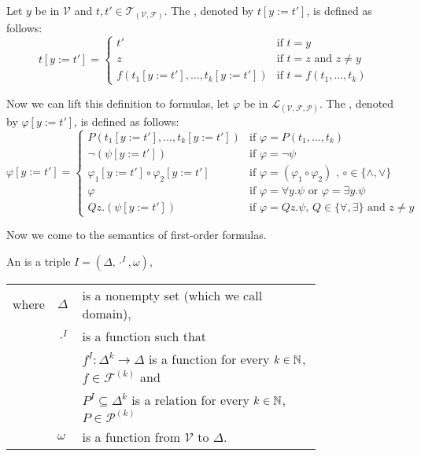 \begin{definition}\label{def.2.20}
	Let $y$ be in $\mathcal{V}$ and $t,t'\in\mathcal{T}_{(\mathcal{V},\mathcal{F})}$. The , denoted by $t\left[y:=t'\right]$, is defined as follows:
	\[t\left[y:=t'\right]=
		\begin{cases}
			t'                                                   & \text{if $t=y$}                \\ 
			z                                                    & \text{if $t=z$ and $z\neq y$}  \\%
			f(t_1\left[y:=t'\right],\dots,t_k\left[y:=t'\right]) & \text{if $t=f(t_1,\dots,t_k)$} 
		\end{cases}\]
	
	Now we can lift this definition to formulas, let $\varphi$ be in $\mathcal{L}_{(\mathcal{V},\mathcal{F},\mathcal{P})}$. The , denoted by $\varphi\left[y:=t'\right]$, is defined as follows:
	\[\varphi\left[y:=t'\right]=
		\begin{cases}
			P(t_1\left[y:=t'\right],\dots,t_k\left[y:=t'\right])        & \text{if $\varphi=P(t_1,\dots,t_k)$}                                     \\
			\neg(\psi\left[y:=t'\right])                                      & \text{if $\varphi=\neg\psi$}                                             \\ %
			\varphi_1\left[y:=t'\right]\circ\varphi_2\left[y:=t'\right] & \text{if $\varphi=(\varphi_1\circ\varphi_2)$ , $\circ\in\{\wedge,\vee\}$} \\
			\varphi                                                     & \text{if $\varphi=\forall y.\psi$ or $\varphi=\exists y.\psi$}                   \\
			Q z.(\psi\left[y:=t'\right])                                 & \text{if $\varphi=Q z.\psi$, $Q\in\{\forall,\exists\}$ and $z\neq y$}     
		\end{cases}\]

\end{definition}
Now we come to the semantics of first-order formulas.
\begin{definition}\label{def.2.21}
	An  is a triple $I=(\Delta,\cdot^I,\omega)$,
	\begin{tabular}{llp{0.78\linewidth}}
		where & $\Delta$  & is a nonempty set (which we call  domain),                                                     \\
& $\cdot^I$ & is a function such that                                                                        \\
&           & $f^I\colon\Delta^k\to\Delta$  is a function for every $k\in\mathbb{N}$, $f\in\mathcal{F}^{(k)}$ and \\
&           & $P^I\subseteq\Delta^k$ is a relation for every $k\in\mathbb{N}$, $P\in\mathcal{P}^{(k)}$       \\
& $\omega$  & is a function from $\mathcal{V}$ to $\Delta$.                                                  
	\end{tabular}
\end{definition}
